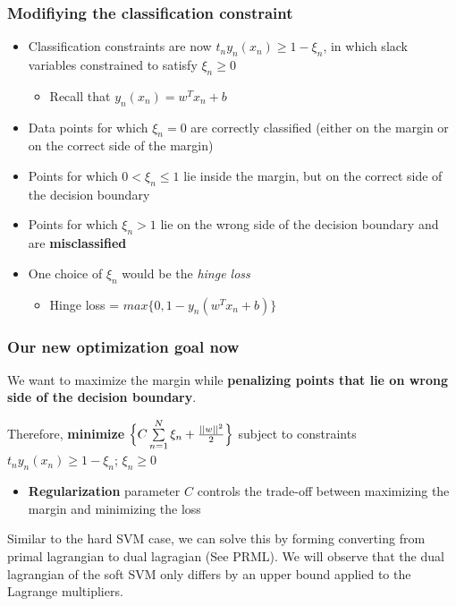 \documentclass{article}
\begin{document}
\subsubsection{Modifiying the classification constraint}
\begin{itemize}
    \item Classification constraints are now $t_{n}y_{n}(x_{n}) \ge 1 - \xi_{n}$, in which slack variables constrained to satisfy $\xi_{n} \ge 0$
        \begin{itemize}
            \item Recall that $y_{n}(x_{n}) = w^{T}x_{n}+b$
        \end{itemize}
    \item Data points for which $\xi_{n} = 0$ are correctly classified (either on the margin or on the correct side of the margin)
    \item Points for which $0 < \xi_{n} \le 1$ lie inside the margin, but on the correct side of the decision boundary
    \item Points for which $\xi_{n} > 1$ lie on the wrong side of the decision boundary and are \textbf{misclassified}
    \item One choice of $\xi_{n}$ would be the \textit{hinge loss}
        \begin{itemize}
            \item Hinge loss = $max\{0, 1-y_{n}(w^{T}x_{n}+b)\}$
        \end{itemize}
\end{itemize}

\subsubsection{Our new optimization goal now}
We want to maximize the margin while \textbf{penalizing points that lie on wrong side of the decision boundary}.

Therefore, \textbf{minimize} $\Bigl\{C\sum\limits_{n=1}^{N}\xi_{n} + \frac{||w||^{2}}{2}\Bigr\}$ subject to constraints $t_{n}y_{n}(x_{n}) \ge 1 - \xi_{n}$; $\xi_{n} \ge 0$
\begin{itemize}
    \item \textbf{Regularization} parameter $C$ controls the trade-off between maximizing the margin and minimizing the loss
\end{itemize}

Similar to the hard SVM case, we can solve this by forming converting from primal lagrangian to dual lagragian (See PRML).
We will observe that the dual lagrangian of the soft SVM only differs by an upper bound applied to the Lagrange multipliers.
\end{document}
